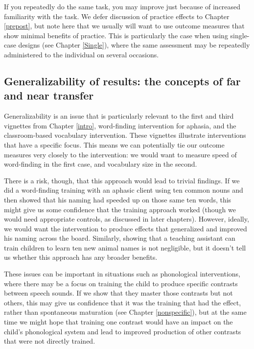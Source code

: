 \documentclass{krantz}
\begin{document}
If you repeatedly do the same task, you may improve just because of increased familiarity with the task. We defer discussion of practice effects to Chapter \ref{prepost}, but note here that we usually will want to use outcome measures that show minimal benefits of practice. This is particularly the case when using single-case designs (see Chapter \ref{Single}), where the same assessment may be repeatedly administered to the individual on several occasions.

\hypertarget{generalizability-of-results-the-concepts-of-far-and-near-transfer}{%
\subsection{Generalizability of results: the concepts of far and near transfer}\label{generalizability-of-results-the-concepts-of-far-and-near-transfer}}

Generalizability is an issue that is particularly relevant to the first and third vignettes from Chapter \ref{intro}, word-finding intervention for aphasia, and the classroom-based vocabulary intervention. These vignettes illustrate interventions that have a specific focus. This means we can potentially tie our outcome measures very closely to the intervention: we would want to measure speed of word-finding in the first case, and vocabulary size in the second.

There is a risk, though, that this approach would lead to trivial findings. If we did a word-finding training with an aphasic client using ten common nouns and then showed that his naming had speeded up on those same ten words, this might give us some confidence that the training approach worked (though we would need appropriate controls, as discussed in later chapters). However, ideally, we would want the intervention to produce effects that generalized and improved his naming across the board. Similarly, showing that a teaching assistant can train children to learn ten new animal names is not negligible, but it doesn't tell us whether this approach has any broader benefits.

These issues can be important in situations such as phonological interventions, where there may be a focus on training the child to produce specific contrasts between speech sounds. If we show that they master those contrasts but not others, this may give us confidence that it was the training that had the effect, rather than spontaneous maturation (see Chapter \ref{nonspecific}), but at the same time we might hope that training one contrast would have an impact on the child's phonological system and lead to improved production of other contrasts that were not directly trained.
\end{document}
